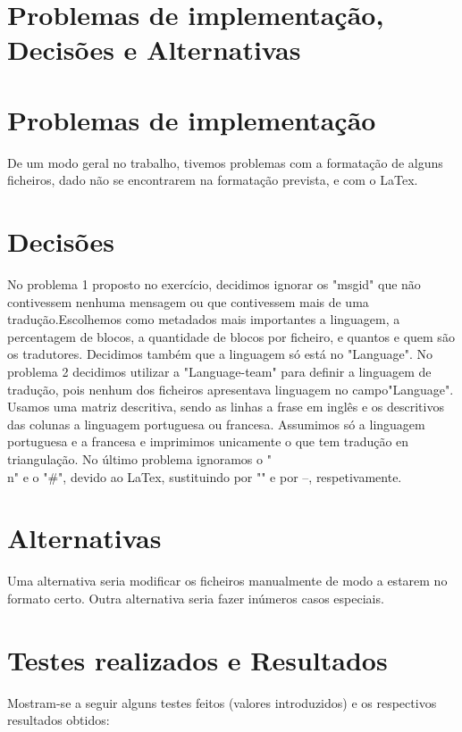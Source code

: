 \documentclass{report}
\def\titulo#1{\section{#1}}
\begin{document}
\section{Problemas de implementação, Decisões e Alternativas}
\titulo{Problemas de implementação}
De um modo geral no trabalho, tivemos problemas com a formatação de alguns ficheiros, dado não se encontrarem na formatação prevista, e com o LaTex.
\titulo{Decisões}
No problema 1 proposto no exercício, decidimos ignorar os "msgid" que não contivessem nenhuma mensagem ou que contivessem mais de uma tradução.Escolhemos como metadados mais importantes a linguagem, a percentagem de blocos, a quantidade de blocos por ficheiro, e quantos e quem são os tradutores. Decidimos também que a linguagem só está no "Language".
No problema 2 decidimos utilizar a "Language-team" para definir a linguagem de tradução, pois nenhum dos ficheiros apresentava linguagem no campo"Language". Usamos uma matriz descritiva, sendo as linhas a frase em inglês e os descritivos das colunas a linguagem portuguesa ou francesa. Assumimos só a linguagem portuguesa e a francesa e imprimimos unicamente o que tem tradução en triangulação.
No último problema ignoramos o "\\n" e o "\#", devido ao LaTex, sustituindo por "" e por --, respetivamente.
\titulo{Alternativas}
Uma alternativa seria modificar os ficheiros manualmente de modo a estarem no formato certo. Outra alternativa seria fazer inúmeros casos especiais.







\section{Testes realizados e Resultados}
Mostram-se a seguir alguns testes feitos (valores introduzidos) e
os respectivos resultados obtidos:




\end{document}
